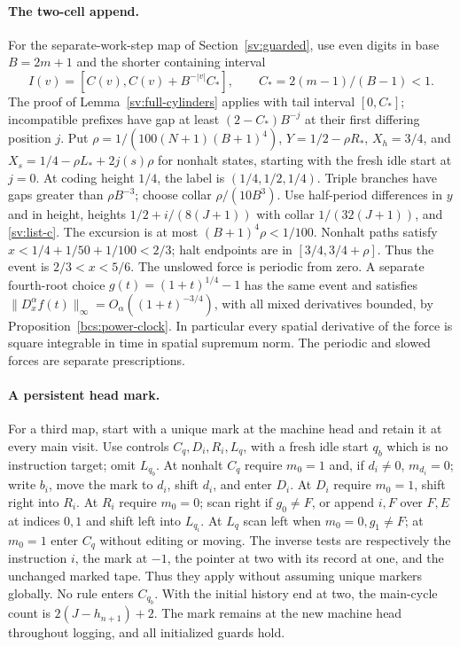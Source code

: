 \paragraph{The two-cell append.}
For the separate-work-step map of Section~\ref{sv:guarded}, use even
digits in base $B=2m+1$ and the shorter containing interval
\[
 I(v)=[C(v),C(v)+B^{-|v|}C_*],\qquad C_*=2(m-1)/(B-1)<1.
\]
The proof of Lemma~\ref{sv:full-cylinders} applies with tail interval
$[0,C_*]$; incompatible prefixes have gap at least
$(2-C_*)B^{-j}$ at their first differing position $j$.
Put $\rho=1/(100(N+1)(B+1)^4)$,
$Y=1/2-\rho R_*$, $X_h=3/4$, and
$X_s=1/4-\rho L_*+2j(s)\rho$ for nonhalt states, starting
with the fresh idle start at $j=0$.  At coding height $1/4$, the label
is $(1/4,1/2,1/4)$.  Triple branches have gaps greater than
$\rho B^{-3}$; choose collar $\rho/(10B^3)$.
Use half-period differences in $y$ and in height, heights
$1/2+i/(8(J+1))$ with collar $1/(32(J+1))$, and
\eqref{sv:list-c}.  The excursion is at most
$(B+1)^4\rho<1/100$.  Nonhalt paths satisfy
$x<1/4+1/50+1/100<2/3$; halt endpoints are in
$[3/4,3/4+\rho]$.  Thus the event is $2/3<x<5/6$.
The unslowed force is periodic from zero.  A separate fourth-root choice
$g(t)=(1+t)^{1/4}-1$ has the same event and satisfies
$\|D_x^\alpha f(t)\|_\infty=O_\alpha((1+t)^{-3/4})$,
with all mixed derivatives bounded, by Proposition~\ref{bcs:power-clock}.
In particular every spatial derivative of the force is square integrable
in time in spatial supremum norm.  The periodic and slowed forces are
separate prescriptions.

\paragraph{A persistent head mark.}
For a third map, start with a unique mark at the machine head and retain
it at every main visit.  Use controls $C_q,D_i,R_i,L_q$, with a fresh
idle start $q_b$ which is no instruction target; omit $L_{q_b}$.
At nonhalt $C_q$ require $m_0=1$ and, if $d_i\ne0$, $m_{d_i}=0$;
write $b_i$, move the mark to $d_i$, shift $d_i$, and enter $D_i$.
At $D_i$ require $m_0=1$, shift right into $R_i$.
At $R_i$ require $m_0=0$; scan right if $g_0\ne F$, or append
$i,F$ over $F,E$ at indices $0,1$ and shift left into $L_{q_i}$.
At $L_q$ scan left when $m_0=0,g_1\ne F$; at $m_0=1$ enter
$C_q$ without editing or moving.  The inverse tests are respectively
the instruction $i$, the mark at $-1$, the pointer at two with its
record at one, and the unchanged marked tape.  Thus they apply without
assuming unique markers globally.  No rule enters $C_{q_b}$.
With the initial history end at two, the main-cycle count is
$2(J-h_{n+1})+2$.  The mark remains at the new machine head throughout
logging, and all initialized guards hold.

